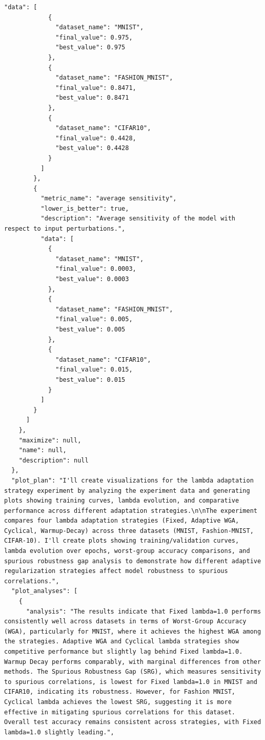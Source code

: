 \begin{appendices}
\begin{tcolorbox}[breakable, colback=orange!5!white, colframe=orange!80!black, title=Example Stage 4 summary]
\begin{Verbatim}[breaklines, breakafter={/,_,-,.}, breaksymbol={}, breaksymbolleft={}, fontsize=\small]
          "data": [
            {
              "dataset_name": "MNIST",
              "final_value": 0.975,
              "best_value": 0.975
            },
            {
              "dataset_name": "FASHION_MNIST",
              "final_value": 0.8471,
              "best_value": 0.8471
            },
            {
              "dataset_name": "CIFAR10",
              "final_value": 0.4428,
              "best_value": 0.4428
            }
          ]
        },
        {
          "metric_name": "average sensitivity",
          "lower_is_better": true,
          "description": "Average sensitivity of the model with respect to input perturbations.",
          "data": [
            {
              "dataset_name": "MNIST",
              "final_value": 0.0003,
              "best_value": 0.0003
            },
            {
              "dataset_name": "FASHION_MNIST",
              "final_value": 0.005,
              "best_value": 0.005
            },
            {
              "dataset_name": "CIFAR10",
              "final_value": 0.015,
              "best_value": 0.015
            }
          ]
        }
      ]
    },
    "maximize": null,
    "name": null,
    "description": null
  },
  "plot_plan": "I'll create visualizations for the lambda adaptation strategy experiment by analyzing the experiment data and generating plots showing training curves, lambda evolution, and comparative performance across different adaptation strategies.\n\nThe experiment compares four lambda adaptation strategies (Fixed, Adaptive WGA, Cyclical, Warmup-Decay) across three datasets (MNIST, Fashion-MNIST, CIFAR-10). I'll create plots showing training/validation curves, lambda evolution over epochs, worst-group accuracy comparisons, and spurious robustness gap analysis to demonstrate how different adaptive regularization strategies affect model robustness to spurious correlations.",
  "plot_analyses": [
    {
      "analysis": "The results indicate that Fixed lambda=1.0 performs consistently well across datasets in terms of Worst-Group Accuracy (WGA), particularly for MNIST, where it achieves the highest WGA among the strategies. Adaptive WGA and Cyclical lambda strategies show competitive performance but slightly lag behind Fixed lambda=1.0. Warmup Decay performs comparably, with marginal differences from other methods. The Spurious Robustness Gap (SRG), which measures sensitivity to spurious correlations, is lowest for Fixed lambda=1.0 in MNIST and CIFAR10, indicating its robustness. However, for Fashion MNIST, Cyclical lambda achieves the lowest SRG, suggesting it is more effective in mitigating spurious correlations for this dataset. Overall test accuracy remains consistent across strategies, with Fixed lambda=1.0 slightly leading.",

\end{Verbatim}
\end{tcolorbox}
\end{appendices}
